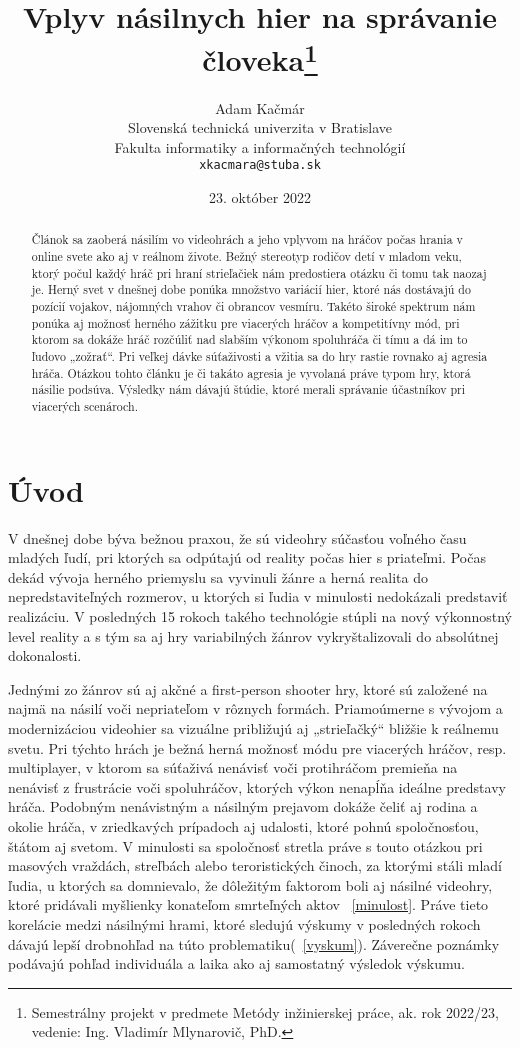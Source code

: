 \documentclass[10pt,twoside,slovak,a4paper]{article}
\title{Vplyv násilnych hier na správanie človeka\thanks{Semestrálny projekt v predmete Metódy inžinierskej práce, ak. rok 2022/23, vedenie: Ing. Vladimír Mlynarovič, PhD.}} %
\author{Adam Kačmár\\[2pt]
	{\small Slovenská technická univerzita v Bratislave}\\
	{\small Fakulta informatiky a informačných technológií}\\
	{\small \texttt{xkacmara@stuba.sk}}
	}
\date{\small 23. október 2022} %
\begin{document}
\maketitle

\begin{abstract}
Článok sa zaoberá násilím vo videohrách a jeho vplyvom na hráčov počas hrania v online svete ako aj v reálnom živote. Bežný stereotyp rodičov detí v mladom veku, ktorý počul každý hráč pri hraní strieľačiek nám predostiera otázku či tomu tak naozaj je. Herný svet v dnešnej dobe ponúka množstvo variácií hier, ktoré nás dostávajú do pozícií vojakov, nájomných vrahov či obrancov vesmíru. Takéto široké spektrum nám ponúka aj možnosť herného zážitku pre viacerých hráčov a kompetitívny mód, pri ktorom sa dokáže hráč rozčúliť nad slabším výkonom spoluhráča či tímu a dá im to ľudovo „zožrať“. Pri veľkej dávke súťaživosti a vžitia sa do hry rastie rovnako aj agresia hráča. Otázkou tohto článku je či takáto agresia je vyvolaná práve typom hry, ktorá násilie podsúva. Výsledky nám dávajú štúdie, ktoré merali správanie účastníkov pri viacerých scenároch.
\end{abstract}



\section{Úvod}

V dnešnej dobe býva bežnou praxou, že sú videohry súčasťou voľného času mladých ľudí, pri ktorých sa odpútajú od reality počas hier s priateľmi. Počas dekád vývoja herného priemyslu sa vyvinuli žánre a herná realita do nepredstaviteľných rozmerov, u ktorých si ľudia v minulosti nedokázali predstaviť realizáciu. V posledných 15 rokoch takého technológie stúpli na nový výkonnostný level reality a s tým sa aj hry variabilných žánrov vykryštalizovali do absolútnej dokonalosti.

Jednými zo žánrov sú aj akčné a first-person shooter hry, ktoré sú založené na najmä na násilí voči nepriateľom v rôznych formách. Priamoúmerne s vývojom a modernizáciou videohier sa vizuálne približujú aj „strieľačký“ bližšie k reálnemu svetu. Pri týchto hrách je bežná herná možnosť módu pre viacerých hráčov, resp. multiplayer, v ktorom sa súťaživá nenávisť voči protihráčom premieňa na nenávisť z frustrácie voči spoluhráčov, ktorých výkon nenapĺňa ideálne predstavy hráča. Podobným nenávistným a násilným prejavom dokáže čeliť aj rodina a okolie hráča, v zriedkavých prípadoch aj udalosti, ktoré pohnú spoločnosťou, štátom aj svetom.  V minulosti sa spoločnosť stretla práve s touto otázkou pri masových vraždách, streľbách alebo teroristických činoch, za ktorými stáli mladí ľudia, u ktorých sa domnievalo, že dôležitým faktorom boli aj násilné videohry, ktoré pridávali myšlienky konateľom smrteľných aktov ~\ref{minulost}. Práve tieto korelácie medzi násilnými hrami, ktoré sledujú výskumy v posledných rokoch dávajú lepší drobnohľad na túto problematiku(~\ref{vyskum}). Záverečne poznámky podávajú pohľad individuála a laika ako aj samostatný výsledok výskumu.
\end{document}
